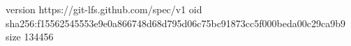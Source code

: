 version https://git-lfs.github.com/spec/v1
oid sha256:f15562545553e9e0a866748d68d795d06c75bc91873cc5f000beda00c29ca9b9
size 134456
